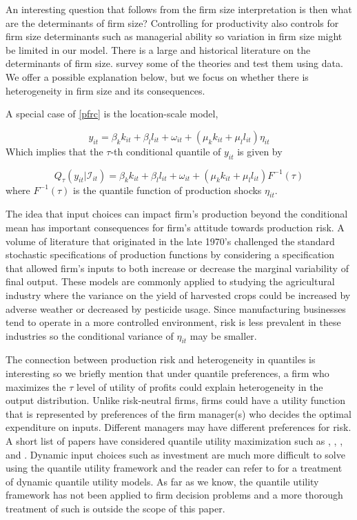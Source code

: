 \documentclass[11pt]{article}
\begin{document}
 An interesting question that follows from the firm size interpretation is then what are the determinants of firm size? Controlling for productivity also controls for firm size determinants such as managerial ability so variation in firm size might be limited in our model. There is a large and historical literature on the determinants of firm size. \cite{Kumar1999} survey some of the theories and test them using data. We offer a possible explanation below, but we focus on whether there is heterogeneity in firm size and its consequences. 

A special case of \eqref{pfrc} is the location-scale model,

\begin{equation} \label{locationscale}
    y_{it}=\beta_{k}k_{it}+\beta_{l}l_{it}+\omega_{it}+(\mu_{k}k_{it}+\mu_{l}l_{it})\eta_{it}
\end{equation}
Which implies that the $\tau$-th conditional quantile of $y_{it}$ is given by

\begin{equation}
Q_{\tau}(y_{it}|\mathcal{I}_{it})=\beta_{k}k_{it}+\beta_{l}l_{it}+\omega_{it}+(\mu_{k}k_{it}+\mu_{l}l_{it})F^{-1}(\tau)
\end{equation}
where $F^{-1}(\tau)$ is the quantile function of production shocks $\eta_{it}$.

The idea that input choices can impact firm's production beyond the conditional mean has important consequences for firm's attitude towards production risk. A volume of literature that originated in the late 1970's challenged the standard stochastic specifications of production functions \citep{Just1978,Just1979} by considering a specification that allowed firm's inputs to both increase or decrease the marginal variability of final output. These models are commonly applied to studying the agricultural industry where the variance on the yield of harvested crops could be increased by adverse weather or decreased by pesticide usage. Since manufacturing businesses tend to operate in a more controlled environment, risk is less prevalent in these industries so the conditional variance of $\eta_{it}$ may be smaller.

The connection between production risk and heterogeneity in quantiles is interesting so we briefly mention that under quantile preferences, a firm who maximizes the $\tau$ level of utility of profits could explain heterogeneity in the output distribution. Unlike risk-neutral firms, firms could have a utility function that is represented by preferences of the firm manager(s) who decides the optimal expenditure on inputs. Different managers may have different preferences for risk. A short list of papers have considered quantile utility maximization such as \cite{Manski1988}, \cite{ROSTEK2009}, \cite{Chambers2007}, and \cite{Bhattacharya2009}. Dynamic input choices such as investment are much more difficult to solve using the quantile utility framework and the reader can refer to \cite{Castro2017} for a treatment of dynamic quantile utility models. As far as we know, the quantile utility framework has not been applied to firm decision problems and a more thorough treatment of such is outside the scope of this paper.
\end{document}
